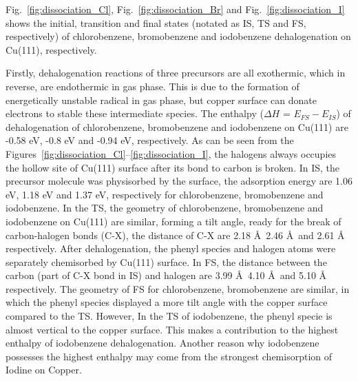 \documentclass[%
 reprint,
 amsmath,amssymb,
 aps,
prb,
]{revtex4-2}
\begin{document}
Fig.~\ref{fig:dissociation_Cl}, Fig.~\ref{fig:dissociation_Br} and Fig.~\ref{fig:dissociation_I} shows the initial, transition and final states (notated as IS, TS and FS, respectively) of chlorobenzene, bromobenzene and iodobenzene dehalogenation on Cu(111), respectively. 

Firstly, dehalogenation reactions of three precursors are all exothermic, which in reverse, are endothermic in gas phase. This is due to the formation of energetically unstable radical in gas phase, but copper surface can donate electrons to stable these intermediate species.
The enthalpy ($\Delta H$ = $E_{FS} - E_{IS}$) of dehalogenation of chlorobenzene, bromobenzene and iodobenzene on Cu(111) are -0.58 eV, -0.8 eV and -0.94 eV, respectively. As can be seen from the Figures~\ref{fig:dissociation_Cl}--\ref{fig:dissociation_I}, the halogens always occupies the hollow site of Cu(111) surface after its bond to carbon is broken. 
In IS, the precursor molecule was physisorbed by the surface, the adsorption energy are 1.06 eV, 1.18 eV and 1.37 eV, respectively for chlorobenzene, bromobenzene and iodobenzene. 
%
In the TS, the geometry of chlorobenzene, bromobenzene and iodobenzene on Cu(111) are similar, forming a tilt angle, ready for the break of carbon-halogen bonds (C-X), the distance of C-X are 2.18 \AA\, 2.46 \AA\ and 2.61 \AA\, respectively. 
After dehalogenation, the phenyl species and halogen atoms were separately chemisorbed by Cu(111) surface. In FS, the distance between the carbon (part of C-X bond in IS) and halogen are 3.99 \AA\, 4.10 \AA\ and 5.10 \AA\, respectively. The geometry of FS for chlorobenzene, bromobenzene are similar, in which the phenyl species displayed a more tilt angle with the copper surface compared to the TS. 
However, In the TS of iodobenzene, the phenyl specie is almost vertical to the copper surface. This makes a contribution to the highest enthalpy of iodobenzene dehalogenation. Another reason why iodobenzene possesses the highest enthalpy may come from the strongest chemisorption of Iodine on Copper. 
\end{document}

